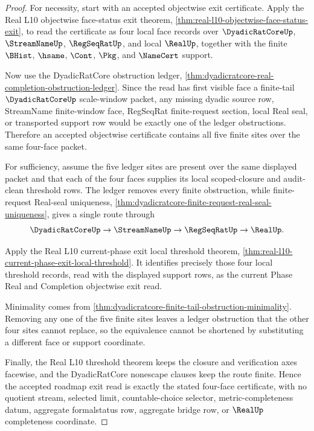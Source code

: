 \begin{proof}
For necessity, start with an accepted objectwise exit certificate. Apply the Real L10 objectwise face-status exit theorem, \autoref{thm:real-l10-objectwise-face-status-exit}, to read the certificate as four local face records over $\DyadicRatCoreUp$, $\StreamNameUp$, $\RegSeqRatUp$, and local $\RealUp$, together with the finite $\BHist$, $\hsame$, $\Cont$, $\Pkg$, and $\NameCert$ support.

Now use the DyadicRatCore obstruction ledger, \autoref{thm:dyadicratcore-real-completion-obstruction-ledger}. Since the read has first visible face a finite-tail $\DyadicRatCoreUp$ scale-window packet, any missing dyadic source row, StreamName finite-window face, RegSeqRat finite-request section, local Real seal, or transported support row would be exactly one of the ledger obstructions. Therefore an accepted objectwise certificate contains all five finite sites over the same four-face packet.

For sufficiency, assume the five ledger sites are present over the same displayed packet and that each of the four faces supplies its local scoped-closure and audit-clean threshold rows. The ledger removes every finite obstruction, while finite-request Real-seal uniqueness, \autoref{thm:dyadicratcore-finite-request-real-seal-uniqueness}, gives a single route through
$$
\DyadicRatCoreUp \to \StreamNameUp \to \RegSeqRatUp \to \RealUp.
$$

Apply the Real L10 current-phase exit local threshold theorem, \autoref{thm:real-l10-current-phase-exit-local-threshold}. It identifies precisely those four local threshold records, read with the displayed support rows, as the current Phase Real and Completion objectwise exit read.

Minimality comes from \autoref{thm:dyadicratcore-finite-tail-obstruction-minimality}. Removing any one of the five finite sites leaves a ledger obstruction that the other four sites cannot replace, so the equivalence cannot be shortened by substituting a different face or support coordinate.

Finally, the Real L10 threshold theorem keeps the closure and verification axes facewise, and the DyadicRatCore nonescape clauses keep the route finite. Hence the accepted roadmap exit read is exactly the stated four-face certificate, with no quotient stream, selected limit, countable-choice selector, metric-completeness datum, aggregate formalstatus row, aggregate bridge row, or $\RealUp$ completeness coordinate.
\end{proof}

